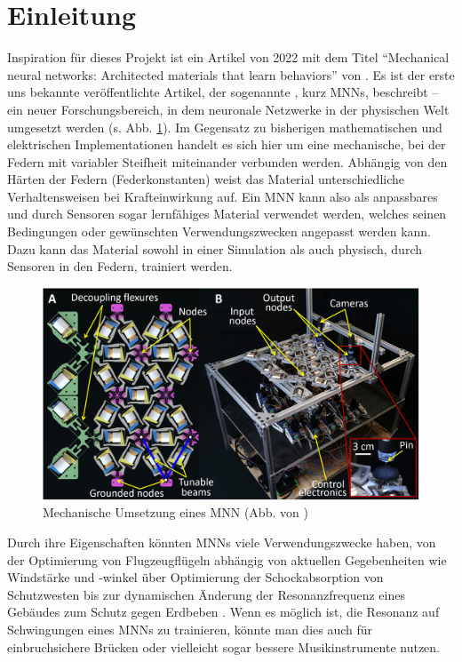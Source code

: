 \section{Einleitung}

Inspiration für dieses Projekt ist ein Artikel von 2022 mit dem Titel \enquote{Mechanical neural networks: Architected materials that learn behaviors} von \lee{} \cite{Lee2022}.
%
Es ist der erste uns bekannte veröffentlichte Artikel, der sogenannte , kurz MNNs, beschreibt -- ein neuer Forschungsbereich, in dem neuronale Netzwerke in der physischen Welt umgesetzt werden (s. Abb. \ref{fig:mnn2-1}).
Im Gegensatz zu bisherigen mathematischen und elektrischen Implementationen handelt es sich hier um eine mechanische, bei der Federn mit variabler Steifheit miteinander verbunden werden.
Abhängig von den Härten der Federn (Federkonstanten) weist das Material unterschiedliche Verhaltensweisen bei Krafteinwirkung auf. 
%
Ein MNN kann also als anpassbares und durch Sensoren sogar lernfähiges Material verwendet werden, welches seinen Bedingungen oder gewünschten Verwendungszwecken angepasst werden kann.
Dazu kann das Material sowohl in einer Simulation als auch physisch, durch Sensoren in den Federn, trainiert werden.

\begin{figure}[htbp!]
    \centering
    \includegraphics[width=0.65\linewidth]{bilder/mnn2-1.jpg}
    \caption{Mechanische Umsetzung eines MNN (Abb. von \cite{Lee2022})}
    \label{fig:mnn2-1}
\end{figure}

Durch ihre Eigenschaften könnten MNNs viele Verwendungszwecke haben, von der Optimierung von Flugzeugflügeln abhängig von aktuellen Gegebenheiten wie Windstärke und -winkel \cite[2]{Lee2022} über Optimierung der Schockabsorption von Schutzwesten bis zur dynamischen Änderung der Resonanzfrequenz eines Gebäudes zum Schutz gegen Erdbeben \cite[9]{Hopkins2023}.
Wenn es möglich ist, die Resonanz auf Schwingungen eines MNNs zu trainieren, könnte man dies auch für einbruchsichere Brücken oder vielleicht sogar bessere Musikinstrumente nutzen.

